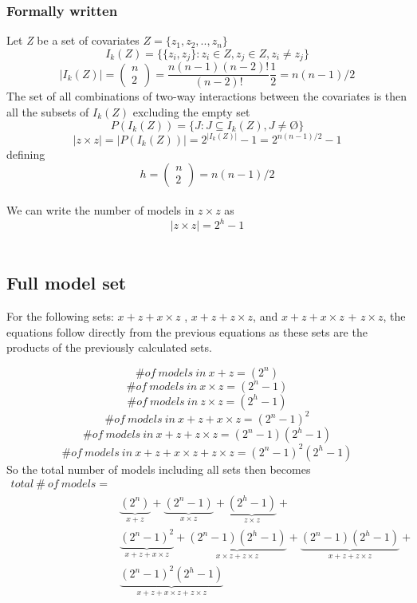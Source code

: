 \subsubsection{Formally written}
Let \emph{Z} be a set of covariates 
$Z=\{z_1,z_2,..,z_n\}$
\[I_k\left(Z\right)=\{\{\left.\left.z_i,z_j\right.\}:z_i\in Z,z_j\in Z,z_i\neq z_j\right.\}\] 
\[\left|I_k\left(Z\right)\right|=\left( \begin{array}{c}
n \\ 
2 \end{array}
\right)=\frac{n\left(n-1\right)\left(n-2\right)!}{\left(n-2\right)!}\frac{1}{2}=n(n-1)/2\] 
The set of all combinations of two-way interactions between the covariates is then all the subsets of $I_k\left(Z\right)$ excluding the empty set
\[P\left(I_k\left(Z\right)\right)=\{\left.J:J\subseteq I_k\left(Z\right),J\neq \textrm{\O}\right.\}\] 
\[\left|z \times z\right|=\left|P\left(I_k\left(Z\right)\right)\right|=2^{\left|I_k\left(Z\right)\right|}-1=2^{n(n-1)/2}-1\] 
defining 
\[h=\left( \begin{array}{c}
n \\ 
2 \end{array}
\right)=n(n-1)/2\] \\
We can write the number of models in $z \times z$ as
\[\left|z \times z\right|=2^h-1\] \\

\subsection{Full model set}
For the following sets: $x + z + x \times z$ , $x + z + z \times z$, and $x + z + x \times z$ + $z \times z$, the equations follow directly from the previous equations as these sets are the products of the previously calculated sets. 

\[\# of\ models\ in\ x + z =\left(2^n\right)\] 
\[\# of\ models\ in\ x \times z=\left(2^n-1\right)\] 
\[\# of\ models\ in\ z \times z=\left(2^h-1\right)\] 
\[\# of\ models\ in\ x + z + x \times z={\left(2^n-1\right)}^2\] 
\[\# of\ models\ in\ x + z+z \times z=\left(2^n-1\right)\left(2^h-1\right)\] 
\[\# of\ models\ in\ x + z + x \times z+z \times z={\left(2^n-1\right)}^2\left(2^h-1\right)\] 
So the total number of models including all sets then becomes
\begin{equation*}
\begin{aligned}
total\ \# \ of\ models=\\
& \underbrace{\left(2^n\right)}_{x + z}+\underbrace{\left(2^n-1\right)}_{x \times z}+\underbrace{\left(2^h-1\right)}_{z \times z}+\\
&\underbrace{{\left(2^n-1\right)}^2}_{x + z + x \times z}+\underbrace{\left(2^n-1\right)\left(2^h-1\right)}_{x \times z+z \times z}+\underbrace{\left(2^n-1\right)\left(2^h-1\right)}_{x + z+z \times z}+\\
&\underbrace{{\left(2^n-1\right)}^2\left(2^h-1\right)}_{x + z + x \times z+z \times z} 
\end{aligned}
\end{equation*}

